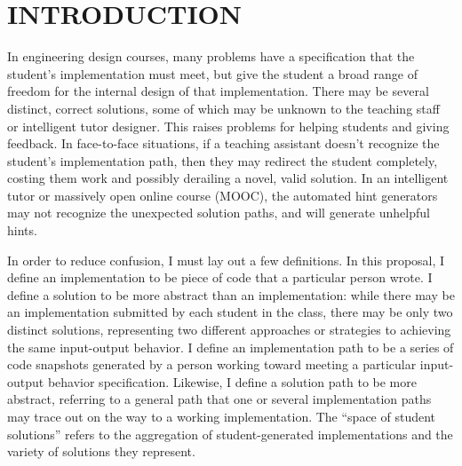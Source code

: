 \documentclass[12pt]{article}
\begin{document}
\section{INTRODUCTION}


In engineering design courses, many problems have a specification that the student's implementation must meet, but give the student a broad range of freedom for the internal design of that implementation. There may be several distinct, correct solutions, some of which may be unknown to the teaching staff or intelligent tutor designer. This raises problems for helping students and giving feedback. In face-to-face situations, if a teaching assistant doesn't recognize the student's implementation path, then they may redirect the student completely, costing them work and possibly derailing a novel, valid solution. In an intelligent tutor or massively open online course (MOOC), the automated hint generators may not recognize the unexpected solution paths, and will generate unhelpful hints.

In order to reduce confusion, I must lay out a few definitions. In this proposal, I define an implementation to be piece of code that a particular person wrote. I define a solution to be more abstract than an implementation: while there may be an implementation submitted by each student in the class, there may be only two distinct solutions, representing two different approaches or strategies to achieving the same input-output behavior. I define an implementation path to be a series of code snapshots generated by a person working toward meeting a particular input-output behavior specification. Likewise, I define a solution path to be more abstract, referring to a general path that one or several implementation paths may trace out on the way to a working implementation. The ``space of student solutions'' refers to the aggregation of student-generated implementations and the variety of solutions they represent.
\end{document}
